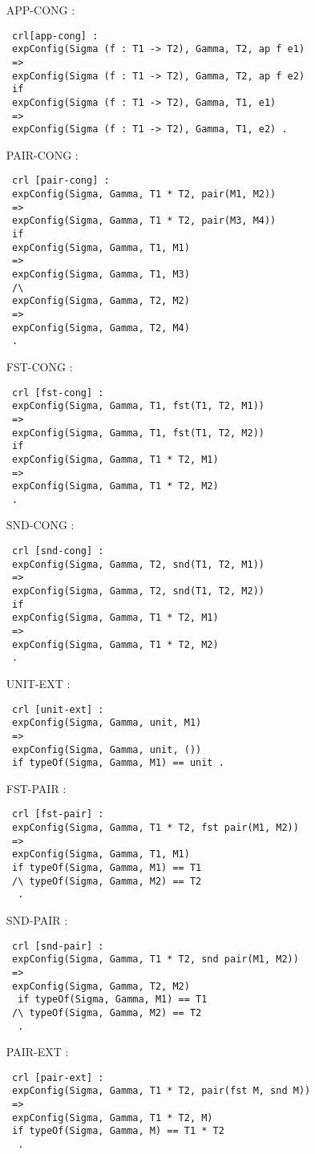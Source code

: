 \documentclass{article}
\begin{document}
\begin{itemize}
\item[APP-CONG]: 
\begin{lstlisting} 
 crl[app-cong] :
 expConfig(Sigma (f : T1 -> T2), Gamma, T2, ap f e1)
 => 
 expConfig(Sigma (f : T1 -> T2), Gamma, T2, ap f e2)
 if 
 expConfig(Sigma (f : T1 -> T2), Gamma, T1, e1)
 => 
 expConfig(Sigma (f : T1 -> T2), Gamma, T1, e2) .
\end{lstlisting}
\item[PAIR-CONG]:
 \begin{lstlisting}
 crl [pair-cong] :
 expConfig(Sigma, Gamma, T1 * T2, pair(M1, M2))
 => 
 expConfig(Sigma, Gamma, T1 * T2, pair(M3, M4))
 if 
 expConfig(Sigma, Gamma, T1, M1)
 => 
 expConfig(Sigma, Gamma, T1, M3)
 /\ 
 expConfig(Sigma, Gamma, T2, M2)
 => 
 expConfig(Sigma, Gamma, T2, M4)
 .
 \end{lstlisting}
\item[FST-CONG]:
 \begin{lstlisting}
 crl [fst-cong] :
 expConfig(Sigma, Gamma, T1, fst(T1, T2, M1))
 => 
 expConfig(Sigma, Gamma, T1, fst(T1, T2, M2)) 
 if
 expConfig(Sigma, Gamma, T1 * T2, M1)
 => 
 expConfig(Sigma, Gamma, T1 * T2, M2)
 .
\end{lstlisting} 
\item[SND-CONG]:
 \begin{lstlisting} 
 crl [snd-cong] :
 expConfig(Sigma, Gamma, T2, snd(T1, T2, M1))
 => 
 expConfig(Sigma, Gamma, T2, snd(T1, T2, M2)) 
 if
 expConfig(Sigma, Gamma, T1 * T2, M1)
 => 
 expConfig(Sigma, Gamma, T1 * T2, M2)
 .
 \end{lstlisting}
\item[UNIT-EXT]:
\begin{lstlisting}
 crl [unit-ext] : 
 expConfig(Sigma, Gamma, unit, M1)
 =>
 expConfig(Sigma, Gamma, unit, ())
 if typeOf(Sigma, Gamma, M1) == unit .
\end{lstlisting} 
\item[FST-PAIR]:
\begin{lstlisting}
 crl [fst-pair] :
 expConfig(Sigma, Gamma, T1 * T2, fst pair(M1, M2))
 =>
 expConfig(Sigma, Gamma, T1, M1) 
 if typeOf(Sigma, Gamma, M1) == T1 
 /\ typeOf(Sigma, Gamma, M2) == T2
  .
\end{lstlisting}
\item[SND-PAIR]:
\begin{lstlisting}
 crl [snd-pair] :
 expConfig(Sigma, Gamma, T1 * T2, snd pair(M1, M2))
 =>
 expConfig(Sigma, Gamma, T2, M2) 
  if typeOf(Sigma, Gamma, M1) == T1 
 /\ typeOf(Sigma, Gamma, M2) == T2
  .
\end{lstlisting}
\item[PAIR-EXT]:
\begin{lstlisting}
 crl [pair-ext] :
 expConfig(Sigma, Gamma, T1 * T2, pair(fst M, snd M))
 =>
 expConfig(Sigma, Gamma, T1 * T2, M) 
 if typeOf(Sigma, Gamma, M) == T1 * T2 
  .
\end{lstlisting}
\end{itemize}
\end{document}
